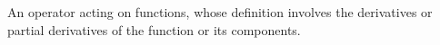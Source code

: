 An operator acting on functions, whose definition involves the 
derivatives or partial derivatives of the function or its components.